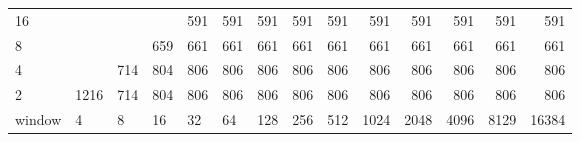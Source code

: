 \begin{table}[h]
{\begin{tabular}{lrrrrrrrrrrrrr}
			\multicolumn{1}{|l|}{16} &  &  &  & \cellcolor[HTML]{E69900}591 & \cellcolor[HTML]{E69900}591 & \cellcolor[HTML]{E69900}591 & \cellcolor[HTML]{E69900}591 & \cellcolor[HTML]{E69900}591 & \cellcolor[HTML]{E69900}591 & \cellcolor[HTML]{E69900}591 & \cellcolor[HTML]{E69900}591 & \cellcolor[HTML]{E69900}591 & \cellcolor[HTML]{E69900}591 \\ \cline{1-1}
			\multicolumn{1}{|l|}{8} &  &  & \cellcolor[HTML]{E60000}659 & \cellcolor[HTML]{E60000}661 & \cellcolor[HTML]{E60000}661 & \cellcolor[HTML]{E60000}661 & \cellcolor[HTML]{E60000}661 & \cellcolor[HTML]{E60000}661 & \cellcolor[HTML]{E60000}661 & \cellcolor[HTML]{E60000}661 & \cellcolor[HTML]{E60000}661 & \cellcolor[HTML]{E60000}661 & \cellcolor[HTML]{E60000}661 \\ \cline{1-1}
			\multicolumn{1}{|l|}{4} &  & \cellcolor[HTML]{E60000}714 & \cellcolor[HTML]{9900E6}804 & \cellcolor[HTML]{9900E6}806 & \cellcolor[HTML]{9900E6}806 & \cellcolor[HTML]{9900E6}806 & \cellcolor[HTML]{9900E6}806 & \cellcolor[HTML]{9900E6}806 & \cellcolor[HTML]{9900E6}806 & \cellcolor[HTML]{9900E6}806 & \cellcolor[HTML]{9900E6}806 & \cellcolor[HTML]{9900E6}806 & \cellcolor[HTML]{9900E6}806 \\ \cline{1-1}
			\multicolumn{1}{|l|}{2} & \cellcolor[HTML]{4C00E6}1216 & \cellcolor[HTML]{E60000}714 & \cellcolor[HTML]{9900E6}804 & \cellcolor[HTML]{9900E6}806 & \cellcolor[HTML]{9900E6}806 & \cellcolor[HTML]{9900E6}806 & \cellcolor[HTML]{9900E6}806 & \cellcolor[HTML]{9900E6}806 & \cellcolor[HTML]{9900E6}806 & \cellcolor[HTML]{9900E6}806 & \cellcolor[HTML]{9900E6}806 & \cellcolor[HTML]{9900E6}806 & \cellcolor[HTML]{9900E6}806 \\ \hline
			\multicolumn{1}{l|}{window} & \multicolumn{1}{l|}{4} & \multicolumn{1}{l|}{8} & \multicolumn{1}{l|}{16} & \multicolumn{1}{l|}{32} & \multicolumn{1}{l|}{64} & \multicolumn{1}{l|}{128} & \multicolumn{1}{l|}{256} & \multicolumn{1}{l|}{512} & \multicolumn{1}{l|}{1024} & \multicolumn{1}{l|}{2048} & \multicolumn{1}{l|}{4096} & \multicolumn{1}{l|}{8129} & \multicolumn{1}{l|}{16384} \\ \cline{2-14} 
		\end{tabular}
	}
\end{table}


